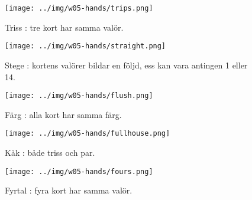 \begin{figure}[H]
 \begin{minipage}[c]{\CardWidth}
  \texttt{[image: ../img/w05-hands/trips.png]}
 \end{minipage}\hfill
 \begin{minipage}[c]{\CardCaptionWidth}
  \caption{Triss : tre kort har samma valör.}
 \end{minipage}
\end{figure}

\begin{figure}[H]
 \begin{minipage}[c]{\CardWidth}
  \texttt{[image: ../img/w05-hands/straight.png]}
 \end{minipage}\hfill
 \begin{minipage}[c]{\CardCaptionWidth}
  \caption{Stege : kortens valörer bildar en följd, ess kan vara antingen 1 eller 14.}
 \end{minipage}
\end{figure}

\begin{figure}[H]
 \begin{minipage}[c]{\CardWidth}
  \texttt{[image: ../img/w05-hands/flush.png]}
 \end{minipage}\hfill
 \begin{minipage}[c]{\CardCaptionWidth}
  \caption{Färg : alla kort har samma färg.}
 \end{minipage}
\end{figure}

\begin{figure}[H]
 \begin{minipage}[c]{\CardWidth}
  \texttt{[image: ../img/w05-hands/fullhouse.png]}
 \end{minipage}\hfill
 \begin{minipage}[c]{\CardCaptionWidth}
  \caption{Kåk : både triss och par.}
 \end{minipage}
\end{figure}

\begin{figure}[H]
 \begin{minipage}[c]{\CardWidth}
  \texttt{[image: ../img/w05-hands/fours.png]}
 \end{minipage}\hfill
 \begin{minipage}[c]{\CardCaptionWidth}
  \caption{Fyrtal : fyra kort har samma valör.}
 \end{minipage}
\end{figure}

